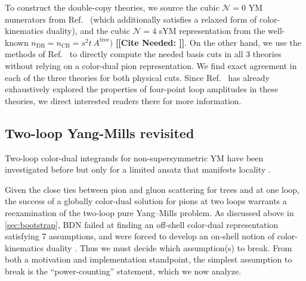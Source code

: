 \documentclass[11pt,letter]{article}
\newcommand{\citepls}[1]{{\bf\color{red}[[Cite Needed: #1]]}}
\newcommand{\atree}{\ensuremath{A^{\text{tree}}}}
\begin{document}
To construct the double-copy theories, we source the cubic
$\mathcal{N}=0$ YM numerators from Ref.~\cite{Bern:2015ooa} (which
additionally satisfies a relaxed form of color-kinematics duality),
and the cubic $\mathcal{N}=4$ sYM representation from the well-known
$n_{\text{DB}} = n_{\text{CB}} = s^2t\, \atree)$ \citepls{}.
On the other hand, we use the methods of Ref.~\cite{Carrasco:2023qgz}
to directly compute the needed basis cuts in all 3 theories without
relying on a color-dual pion representation.  We find exact agreement
in each of the three theories for both physical cuts.  Since
Ref.~\cite{Carrasco:2023qgz} has already exhaustively explored the
properties of four-point loop amplitudes in these theories, we direct
interested readers there for more information.


\subsection{Two-loop Yang-Mills revisited}

Two-loop color-dual integrands for non-supersymmetric YM have been investigated before but only for a limited ansatz that manifests locality \cite{Bern:2015ooa}.

Given the close ties between pion and gluon scattering for trees and
at one loop, the success of a globally color-dual solution for pions
at two loops warrants a reexamination of the two-loop pure Yang--Mills
problem.  As discussed above in \cref{sec:bootstrap}, BDN failed at
finding an off-shell color-dual representation satisfying 7
assumptions, and were forced to develop an on-shell notion of
color-kinematics duality \cite{Bern:2015ooa}.  Thus we must decide
which assumption(s) to break.  From both a motivation and
implementation standpoint, the simplest assumption to break is the
``power-counting'' statement, which we now analyze.
\end{document}
